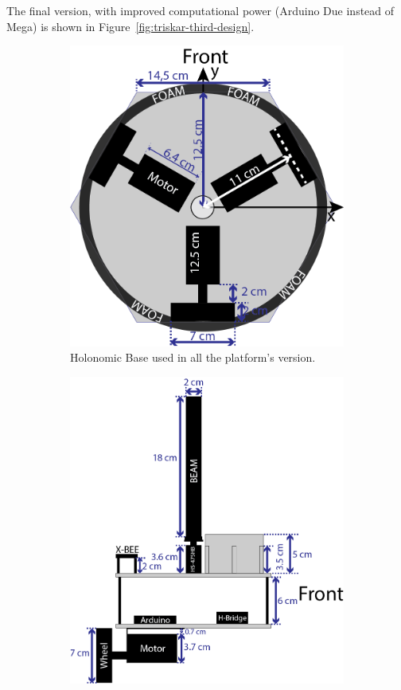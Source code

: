 The final version, with improved computational power (Arduino Due instead of Mega) is shown in Figure~\ref{fig:triskar-third-design}.
\begin{figure}[h]
	\centering
	\begin{subfigure}[c]{0.3\textwidth}
	\centering
	\includegraphics[width=\textwidth]{./Images/TriskarThird.png}
	\caption{Holonomic Base used in all the platform's version.}
	\label{fig:holonomic-platform}
	\end{subfigure}
	\begin{subfigure}[c]{0.3\textwidth}
	\centering
	\includegraphics[width=\textwidth]{./Images/upperFirstB.png}

\end{subfigure}
\end{figure}
